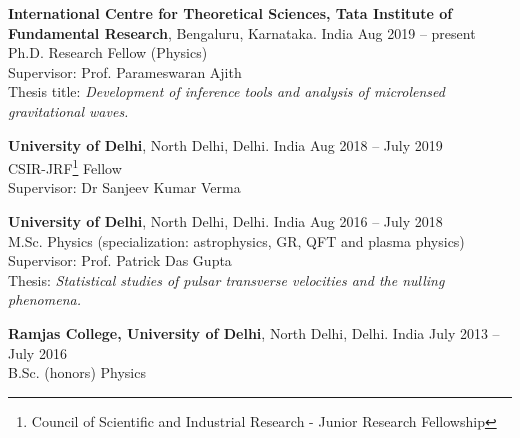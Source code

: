 {\bf International Centre for Theoretical Sciences, Tata Institute of Fundamental Research}, Bengaluru, Karnataka. India \hfill Aug 2019 -- present\\
Ph.D. Research Fellow (Physics)\\
Supervisor: Prof. Parameswaran Ajith\\
Thesis title: \emph{Development of inference tools and analysis of microlensed gravitational waves.}

{\bf University of Delhi}, North Delhi, Delhi. India \hfill Aug 2018 -- July 2019\\
CSIR-JRF\footnote{Council of Scientific and Industrial Research - Junior Research Fellowship} Fellow\\
Supervisor: Dr Sanjeev Kumar Verma

{\bf University of Delhi}, North Delhi, Delhi. India \hfill Aug 2016 -- July 2018\\
M.Sc. Physics (specialization: astrophysics, GR, QFT and plasma physics)\\
Supervisor: Prof. Patrick Das Gupta\\
Thesis: \emph{Statistical studies of pulsar transverse velocities and the nulling phenomena.}

{\bf Ramjas College, University of Delhi}, North Delhi, Delhi. India \hfill July 2013 -- July 2016\\
B.Sc. (honors) Physics 


